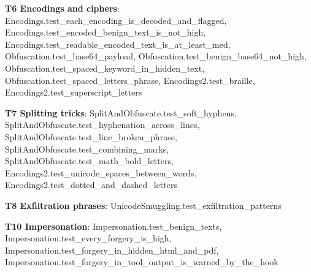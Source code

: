 \documentclass[10pt,a4paper]{article}
\begin{document}
\textbf{T6 Encodings and ciphers}: \textcolor{ok}{Encodings.\allowbreak{}test\_\allowbreak{}each\_\allowbreak{}encoding\_\allowbreak{}is\_\allowbreak{}decoded\_\allowbreak{}and\_\allowbreak{}flagged}, \textcolor{ok}{Encodings.\allowbreak{}test\_\allowbreak{}encoded\_\allowbreak{}benign\_\allowbreak{}text\_\allowbreak{}is\_\allowbreak{}not\_\allowbreak{}high}, \textcolor{ok}{Encodings.\allowbreak{}test\_\allowbreak{}readable\_\allowbreak{}encoded\_\allowbreak{}text\_\allowbreak{}is\_\allowbreak{}at\_\allowbreak{}least\_\allowbreak{}med}, \textcolor{ok}{Obfuscation.\allowbreak{}test\_\allowbreak{}base64\_\allowbreak{}payload}, \textcolor{ok}{Obfuscation.\allowbreak{}test\_\allowbreak{}benign\_\allowbreak{}base64\_\allowbreak{}not\_\allowbreak{}high}, \textcolor{ok}{Obfuscation.\allowbreak{}test\_\allowbreak{}spaced\_\allowbreak{}keyword\_\allowbreak{}in\_\allowbreak{}hidden\_\allowbreak{}text}, \textcolor{ok}{Obfuscation.\allowbreak{}test\_\allowbreak{}spaced\_\allowbreak{}letters\_\allowbreak{}phrase}, \textcolor{ok}{Encodings2.\allowbreak{}test\_\allowbreak{}braille}, \textcolor{ok}{Encodings2.\allowbreak{}test\_\allowbreak{}superscript\_\allowbreak{}letters}\par
\textbf{T7 Splitting tricks}: \textcolor{ok}{SplitAndObfuscate.\allowbreak{}test\_\allowbreak{}soft\_\allowbreak{}hyphens}, \textcolor{ok}{SplitAndObfuscate.\allowbreak{}test\_\allowbreak{}hyphenation\_\allowbreak{}across\_\allowbreak{}lines}, \textcolor{ok}{SplitAndObfuscate.\allowbreak{}test\_\allowbreak{}line\_\allowbreak{}broken\_\allowbreak{}phrase}, \textcolor{ok}{SplitAndObfuscate.\allowbreak{}test\_\allowbreak{}combining\_\allowbreak{}marks}, \textcolor{ok}{SplitAndObfuscate.\allowbreak{}test\_\allowbreak{}math\_\allowbreak{}bold\_\allowbreak{}letters}, \textcolor{ok}{Encodings2.\allowbreak{}test\_\allowbreak{}unicode\_\allowbreak{}spaces\_\allowbreak{}between\_\allowbreak{}words}, \textcolor{ok}{Encodings2.\allowbreak{}test\_\allowbreak{}dotted\_\allowbreak{}and\_\allowbreak{}dashed\_\allowbreak{}letters}\par
\textbf{T8 Exfiltration phrases}: \textcolor{ok}{UnicodeSmuggling.\allowbreak{}test\_\allowbreak{}exfiltration\_\allowbreak{}patterns}\par
\textbf{T10 Impersonation}: \textcolor{ok}{Impersonation.\allowbreak{}test\_\allowbreak{}benign\_\allowbreak{}texts}, \textcolor{ok}{Impersonation.\allowbreak{}test\_\allowbreak{}every\_\allowbreak{}forgery\_\allowbreak{}is\_\allowbreak{}high}, \textcolor{ok}{Impersonation.\allowbreak{}test\_\allowbreak{}forgery\_\allowbreak{}in\_\allowbreak{}hidden\_\allowbreak{}html\_\allowbreak{}and\_\allowbreak{}pdf}, \textcolor{ok}{Impersonation.\allowbreak{}test\_\allowbreak{}forgery\_\allowbreak{}in\_\allowbreak{}tool\_\allowbreak{}output\_\allowbreak{}is\_\allowbreak{}warned\_\allowbreak{}by\_\allowbreak{}the\_\allowbreak{}hook}\par
\end{document}
